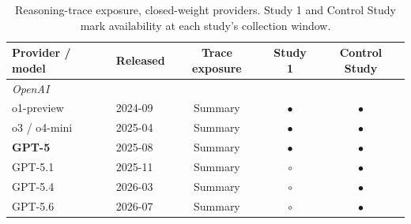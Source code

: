 \documentclass[manuscript,review,anonymous]{acmart}
\begin{document}
\begin{table}[H]
\centering
\footnotesize
\caption{Reasoning-trace exposure, closed-weight providers. Study 1 and
Control Study mark availability at each study's collection window.}
\label{tab:providers_closed}
\begin{tabular}{llccc}
\hline
Provider / model & Released & Trace exposure & Study 1 & Control Study\\ \hline
\multicolumn{5}{l}{\textit{OpenAI}~\cite{openai2024learning,openai2024o1card,openai2025o3o4mini,openai2025reasoningapi}} \\
\quad o1-preview            & 2024-09 & Summary & $\bullet$ & $\bullet$ \\
\quad o3 / o4-mini          & 2025-04 & Summary             & $\bullet$ & $\bullet$ \\
\quad \textbf{GPT-5}        & 2025-08 & Summary             & $\bullet$ & $\bullet$ \\
\quad GPT-5.1               & 2025-11 & Summary             & $\circ$   & $\bullet$ \\
\quad GPT-5.4               & 2026-03 & Summary             & $\circ$   & $\bullet$ \\
\quad GPT-5.6               & 2026-07 & Summary             & $\circ$   & $\bullet$ \\


\end{tabular}
\end{table}
\end{document}
